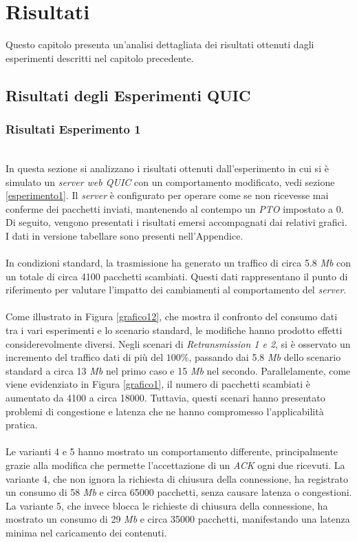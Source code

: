 \chapter{Risultati}
\label{cap:risultati}

Questo capitolo presenta un'analisi dettagliata dei risultati ottenuti dagli esperimenti descritti nel capitolo precedente.

\section{Risultati degli Esperimenti QUIC}
\subsection{Risultati Esperimento 1}
~\\
\indent In questa sezione si analizzano i risultati ottenuti dall'esperimento in cui si è simulato un \emph{server web QUIC} con un comportamento modificato, vedi sezione \ref{esperimento1}.
Il \emph{server} è configurato per operare come se non ricevesse mai conferme dei pacchetti inviati, mantenendo al contempo un \emph{PTO} impostato a 0. 
Di seguito, vengono presentati i risultati emersi accompagnati dai relativi grafici. I dati in versione tabellare sono presenti nell'Appendice.
\\\\
In condizioni standard, la trasmissione ha generato un traffico di circa 5.8 \emph{Mb} con un totale di circa 4100 pacchetti scambiati. 
Questi dati rappresentano il punto di riferimento per valutare l'impatto dei cambiamenti al comportamento del \emph{server}.
\\\\
Come illustrato in Figura \ref{grafico12}, che mostra il confronto del consumo dati tra i vari esperimenti e lo scenario standard, le modifiche hanno prodotto effetti considerevolmente diversi.
Negli scenari di \emph{Retransmission 1 e 2}, si è osservato un incremento del traffico dati di più del $100\%$, passando dai 5.8 \emph{Mb} dello scenario standard a circa 13 \emph{Mb} nel primo caso e 15 \emph{Mb} nel secondo. 
Parallelamente, come viene evidenziato in Figura \ref{grafico1}, il numero di pacchetti scambiati è aumentato da 4100 a circa 18000. 
Tuttavia, questi scenari hanno presentato problemi di congestione e latenza che ne hanno compromesso l'applicabilità pratica.
\\\\
Le varianti 4 e 5 hanno mostrato un comportamento differente, principalmente grazie alla modifica che permette l'accettazione di un \emph{ACK} ogni due ricevuti.
La variante 4, che non ignora la richiesta di chiusura della connessione, ha registrato un consumo di 58 \emph{Mb} e circa 65000 pacchetti, senza causare latenza o congestioni. 
La variante 5, che invece blocca le richieste di chiusura della connessione, ha mostrato un consumo di 29 \emph{Mb} e circa 35000 pacchetti, manifestando una latenza minima nel caricamento dei contenuti.

